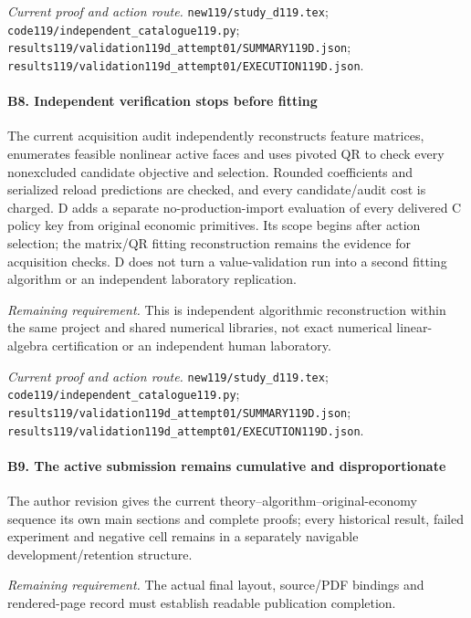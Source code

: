 \par\emph{Current proof and action route.} \nolinkurl{new119/study_d119.tex}; \nolinkurl{code119/independent_catalogue119.py}; \nolinkurl{results119/validation119d_attempt01/SUMMARY119D.json}; \nolinkurl{results119/validation119d_attempt01/EXECUTION119D.json}.

\paragraph{B8. Independent verification stops before fitting}

The current acquisition audit independently reconstructs feature matrices, enumerates feasible nonlinear active faces and uses pivoted QR to check every nonexcluded candidate objective and selection. Rounded coefficients and serialized reload predictions are checked, and every candidate/\allowbreak{}audit cost is charged. D adds a separate no-production-import evaluation of every delivered C policy key from original economic primitives. Its scope begins after action selection; the matrix/\allowbreak{}QR fitting reconstruction remains the evidence for acquisition checks. D does not turn a value-validation run into a second fitting algorithm or an independent laboratory replication.

\par\emph{Remaining requirement.} This is independent algorithmic reconstruction within the same project and shared numerical libraries, not exact numerical linear-algebra certification or an independent human laboratory.

\par\emph{Current proof and action route.} \nolinkurl{new119/study_d119.tex}; \nolinkurl{code119/independent_catalogue119.py}; \nolinkurl{results119/validation119d_attempt01/SUMMARY119D.json}; \nolinkurl{results119/validation119d_attempt01/EXECUTION119D.json}.

\paragraph{B9. The active submission remains cumulative and disproportionate}

The author revision gives the current theory--algorithm--original-economy sequence its own main sections and complete proofs; every historical result, failed experiment and negative cell remains in a separately navigable development/\allowbreak{}retention structure.

\par\emph{Remaining requirement.} The actual final layout, source/\allowbreak{}PDF bindings and rendered-page record must establish readable publication completion.

